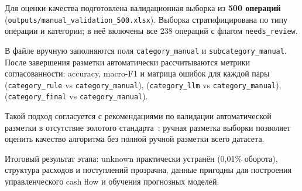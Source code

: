 Для оценки качества подготовлена валидационная выборка из \textbf{500 операций} (\texttt{outputs/manual\_validation\_500.xlsx}). Выборка стратифицирована по типу операции и категории; в неё включены все 238 операций с флагом \texttt{needs\_review}.

В файле вручную заполняются поля \texttt{category\_manual} и \texttt{subcategory\_manual}. После завершения разметки автоматически рассчитываются метрики согласованности: accuracy, macro-F1 и матрица ошибок для каждой пары (\texttt{category\_rule} vs \texttt{category\_manual}), (\texttt{category\_llm} vs \texttt{category\_manual}), (\texttt{category\_final} vs \texttt{category\_manual}).

Такой подход согласуется с рекомендациями по валидации автоматической разметки в отсутствие золотого стандарта~\cite{pustejovsky2012natural}: ручная разметка выборки позволяет оценить качество алгоритма без полной ручной разметки всего датасета.

Итоговый результат этапа: unknown практически устранён (0,01\% оборота), структура расходов и поступлений прозрачна, данные пригодны для построения управленческого cash flow и обучения прогнозных моделей.
